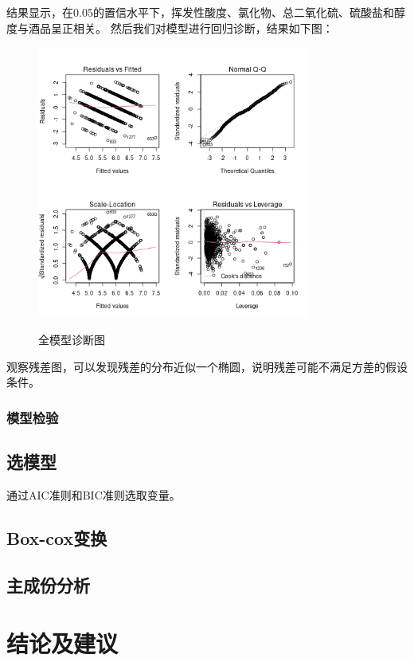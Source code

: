 \documentclass[fontset=ubuntu]{ctexart}
\begin{document}
            结果显示，在0.05的置信水平下，挥发性酸度、氯化物、总二氧化硫、硫酸盐和醇度与酒品呈正相关。
            \clearpage
            然后我们对模型进行回归诊断，结果如下图：

            \begin{figure}[htbp]
                \centering
                \includegraphics[width=0.8\textwidth]{../model-summary/linear-model-plot.png}
                \label{fig:linear-model}
                \caption{全模型诊断图}
            \end{figure}

            观察残差图，可以发现残差的分布近似一个椭圆，说明残差可能不满足方差的假设条件。

            \subsubsection{模型检验}
                
        
        \subsection{选模型}
            通过AIC准则和BIC准则选取变量。
        
        \subsection{Box-cox变换}
        \subsection{主成份分析}
    \section{结论及建议}

    \newpage
\end{document}
